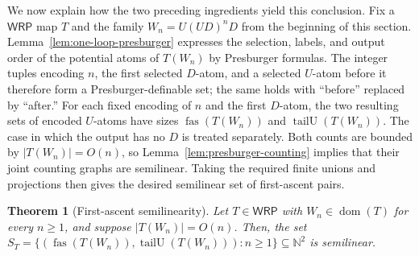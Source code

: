 \documentclass[11pt]{article}
\newtheorem{theorem}{Theorem}[section]
\theoremstyle{definition}
\newcommand{\N}{\mathbb N}
\newcommand{\WRP}{\mathsf{WRP}}
\newcommand{\fas}{\operatorname{fas}}
\newcommand{\tailU}{\operatorname{tailU}}
\begin{document}
We now explain how the two preceding ingredients yield this conclusion.  Fix a
$\WRP$ map $T$ and the family $W_n=U(UD)^nD$ from the beginning of this
section.
Lemma~\ref{lem:one-loop-presburger} expresses the selection, labels, and output
order of the potential atoms of $T(W_n)$ by Presburger formulas.  The integer
tuples encoding $n$, the first selected $D$-atom, and a selected
$U$-atom before it therefore form a Presburger-definable set; the same holds
with ``before'' replaced by ``after.''  For each fixed encoding of $n$ and the
first $D$-atom, the two resulting sets of encoded $U$-atoms have sizes
$\fas(T(W_n))$ and $\tailU(T(W_n))$.  The case in which the output has no $D$ is treated
separately.  Both counts are bounded by $|T(W_n)|=O(n)$, so
Lemma~\ref{lem:presburger-counting} implies that their joint counting graphs
are semilinear.  Taking the required finite unions and projections then gives
the desired semilinear set of first-ascent pairs.

\begin{theorem}[First-ascent semilinearity]
\label{thm:wrp-slice-semilinearity}
Let $T\in\WRP$ with $W_n\in\operatorname{dom}(T)$ for every $n\ge1$, and
suppose $|T(W_n)|=O(n)$.  Then, the set
$S_T=\{(\fas(T(W_n)),\tailU(T(W_n))):n\ge 1\}\subseteq\N^2$
is semilinear.
\end{theorem}
\end{document}
